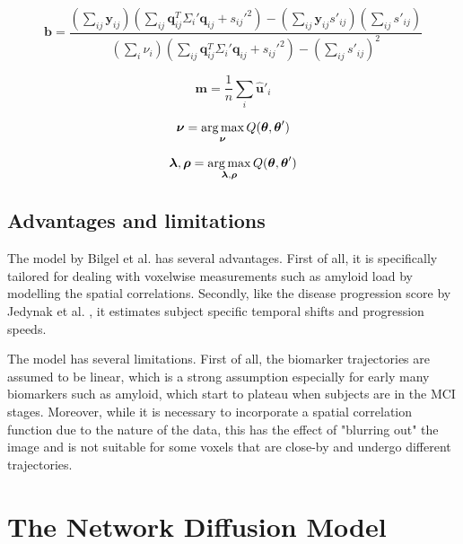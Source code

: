 \begin{equation}
\label{eq:bilgel_mstep2}
 \textbf{b} = \frac{\left( \sum_{ij} \textbf{y}_{ij} \right) \left( \sum_{ij} \textbf{q}_{ij}^T \Sigma_i' \textbf{q}_{ij} + s_{ij}'^2 \right) - \left( \sum_{ij} \textbf{y}_{ij}s'_{ij} \right) \left( \sum_{ij} s'_{ij} \right)}{\left( \sum_i \nu_i \right) \left( \sum_{ij} \textbf{q}_{ij}^T \Sigma_i' \textbf{q}_{ij} + s_{ij}'^2 \right) - \left( \sum_{ij}s'_{ij} \right)^2}
\end{equation}

\begin{equation}
 \textbf{m} = \frac{1}{n}\sum_i \hat{\textbf{u}}'_i
\end{equation}

\begin{equation}
 \boldsymbol{\nu} = \operatorname*{arg\,max}_{\boldsymbol{\nu}} Q(\boldsymbol{\theta}, \boldsymbol{\theta}')
\end{equation}

\begin{equation}
 \boldsymbol{\lambda}, \boldsymbol{\rho} = \operatorname*{arg\,max}_{\boldsymbol{\lambda}, \boldsymbol{\rho}} Q(\boldsymbol{\theta}, \boldsymbol{\theta}')
\end{equation}

\subsection{Advantages and limitations}

The model by Bilgel et al. \cite{bilgel2016multivariate} has several advantages. First of all, it is specifically tailored for dealing with voxelwise measurements such as amyloid load by modelling the spatial correlations. Secondly, like the disease progression score by Jedynak et al. \cite{jedynak2012computational}, it estimates subject specific temporal shifts and progression speeds. 

The model has several limitations. First of all, the biomarker trajectories are assumed to be linear, which is a strong assumption especially for early many biomarkers such as amyloid, which start to plateau when subjects are in the MCI stages. Moreover, while it is necessary to incorporate a spatial correlation function due to the nature of the data, this has the effect of "blurring out" the image and is not suitable for some voxels that are close-by and undergo different trajectories. 

\section{The Network Diffusion Model}
\label{sec:diffusion_raj}

